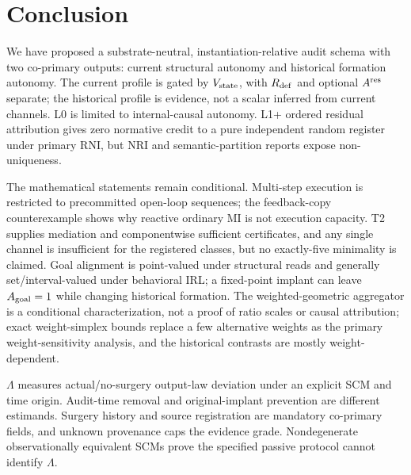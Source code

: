 \section{Conclusion}\label{sec:conclusion}

We have proposed a substrate-neutral, instantiation-relative audit schema with
two co-primary outputs: current structural autonomy and historical formation
autonomy. The current profile is gated by $V_{\mathrm{state}}$, with $R_{\mathrm{def}}$ and optional
$A^{\mathrm{res}}$ separate; the historical profile is evidence, not a scalar inferred
from current channels. L0 is limited to internal-causal autonomy. L1+ ordered
residual attribution gives zero normative credit to a pure independent random
register under primary RNI, but NRI and semantic-partition reports expose
non-uniqueness.

The mathematical statements remain conditional. Multi-step execution is
restricted to precommitted open-loop sequences; the feedback-copy counterexample
shows why reactive ordinary MI is not execution capacity. T2 supplies mediation
and componentwise sufficient certificates, and any single channel is
insufficient for the registered classes, but no exactly-five minimality is
claimed. Goal alignment is point-valued under structural reads and generally
set/interval-valued under behavioral IRL; a fixed-point implant can leave
$A_{\mathrm{goal}}=1$ while changing historical formation. The weighted-geometric
aggregator is a conditional characterization, not a proof of ratio scales or
causal attribution; exact weight-simplex bounds replace a few alternative
weights as the primary weight-sensitivity analysis, and the historical
contrasts are mostly weight-dependent.

$\Lambda$ measures actual/no-surgery output-law deviation under an explicit SCM
and time origin. Audit-time removal and original-implant prevention are
different estimands. Surgery history and source registration are mandatory
co-primary fields, and unknown provenance caps the evidence grade.
Nondegenerate observationally equivalent SCMs prove the specified passive
protocol cannot identify $\Lambda$.

